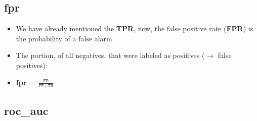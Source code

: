 \documentclass[12pt,a4paper]{article}
\begin{document}
\subsection{fpr}
\begin{itemize}
\item We have already mentioned the \textbf{TPR}, now, the false positive rate (\textbf{FPR}) is the probability of a false alarm
\item The portion, of all negatives, that were labeled as positives ($\rightarrow$ false positives):
\item \textbf{fpr} $= \frac{\texttt{FP}}{\texttt{FP} + \texttt{TN}}$ 
\end{itemize}
\subsection{roc\_auc}
\end{document}
